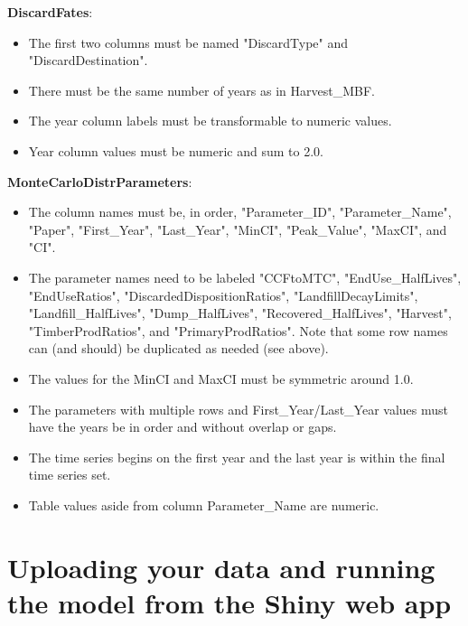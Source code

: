 \documentclass[
  openany]{book}
\providecommand{\tightlist}{%
  \setlength{\itemsep}{0pt}\setlength{\parskip}{0pt}}
\begin{document}
\textbf{DiscardFates}:

\begin{itemize}
\tightlist
\item
  The first two columns must be named "DiscardType" and
  "DiscardDestination".\\
\item
  There must be the same number of years as in Harvest\_MBF.\\
\item
  The year column labels must be transformable to numeric values.\\
\item
  Year column values must be numeric and sum to 2.0.
\end{itemize}

\textbf{MonteCarloDistrParameters}:

\begin{itemize}
\tightlist
\item
  The column names must be, in order, "Parameter\_ID",
  "Parameter\_Name", "Paper", "First\_Year", "Last\_Year", "MinCI",
  "Peak\_Value", "MaxCI", and "CI".\\
\item
  The parameter names need to be labeled "CCFtoMTC",
  "EndUse\_HalfLives", "EndUseRatios", "DiscardedDispositionRatios",
  "LandfillDecayLimits", "Landfill\_HalfLives", "Dump\_HalfLives",
  "Recovered\_HalfLives", "Harvest", "TimberProdRatios", and
  "PrimaryProdRatios". Note that some row names can (and should) be
  duplicated as needed (see above).\\
\item
  The values for the MinCI and MaxCI must be symmetric around 1.0.\\
\item
  The parameters with multiple rows and First\_Year/Last\_Year values
  must have the years be in order and without overlap or gaps.\\
\item
  The time series begins on the first year and the last year is within
  the final time series set.\\
\item
  Table values aside from column Parameter\_Name are numeric.
\end{itemize}

\hypertarget{own-shiny}{%
\section{Uploading your data and running the model from the Shiny web
app}\label{own-shiny}}
\end{document}
